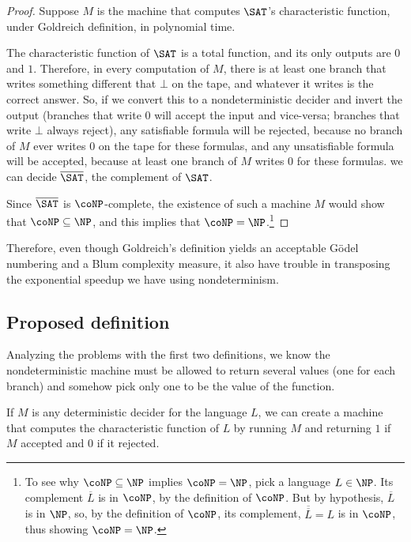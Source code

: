 \documentclass[12pt]{article}
\theoremstyle{definition}
\begin{document}
\begin{proof}
    Suppose $M$ is the machine that computes $\SAT$'s characteristic function,
    under Goldreich definition, in polynomial time.

    The characteristic function of $\SAT$ is a total function,
    and its only outputs are $0$ and $1$.
    Therefore, in every computation of $M$,
    there is at least one branch that writes something different that $\bot$ on the tape,
    and whatever it writes is the correct answer.
    So, if we convert this to a nondeterministic decider and invert the output
    (branches that write $0$ will accept the input and vice-versa;
    branches that write $\bot$ always reject),
    any satisfiable formula will be rejected,
    because no branch of $M$ ever writes $0$ on the tape for these formulas,
    and any unsatisfiable formula will be accepted,
    because at least one branch of $M$ writes $0$ for these formulas.
    we can decide $\overline \SAT$, the complement of $\SAT$.

    Since $\overline \SAT$ is $\coNP$-complete,
    the existence of such a machine $M$
    would show that $\coNP \subseteq \NP$,
    and this implies that $\coNP = \NP$.\footnote{
        To see why $\coNP \subseteq \NP$ implies $\coNP = \NP$,
        pick a language $L \in \NP$.
        Its complement $\overline L$ is in $\coNP$, by the definition of $\coNP$.
        But by hypothesis, $\overline L$ is in $\NP$,
        so, by the definition of $\coNP$,
        its complement, $\overline{\overline L} = L$ is in $\coNP$,
        thus showing $\coNP = \NP$.
    }
\end{proof}

Therefore, even though Goldreich's definition
yields an acceptable Gödel numbering and a Blum complexity measure,
it also have trouble in transposing the exponential speedup
we have using nondeterminism.

\subsection{Proposed definition}

Analyzing the problems with the first two definitions,
we know the nondeterministic machine must be allowed to return several values
(one for each branch)
and somehow pick only one to be the value of the function.

If $M$ is any deterministic decider for the language $L$,
we can create a machine that computes the characteristic function of $L$
by running $M$ and returning $1$ if $M$ accepted and $0$ if it rejected.
\end{document}
